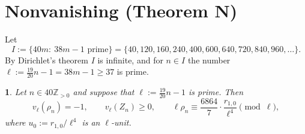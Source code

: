 \documentclass{amsart}
\newcommand{\thisthmname}{}
\newtheorem*{genericthm}{\thisthmname}
\newenvironment{namedthm}[1]{\renewcommand{\thisthmname}{#1}\begin{genericthm}}{\end{genericthm}}
\theoremstyle{definition}
\theoremstyle{remark}
\numberwithin{equation}{section}
\newcommand{\Z}{\mathbb{Z}}
\begin{document}
\section{Nonvanishing (Theorem N)}\label{sec:N}

Let
\[
  I:=\{40m:\ 38m-1\text{ prime}\}=\{40,120,160,240,400,600,640,720,840,960,\dots\}.
\]
By Dirichlet's theorem $I$ is infinite, and for $n\in I$ the number
$\ell:=\frac{19}{20}n-1=38m-1\ge37$ is prime.

\begin{namedthm}{Theorem N}
Let $n\in40\Z_{>0}$ and suppose that $\ell:=\frac{19}{20}n-1$ is prime. Then
\[
  v_\ell(\rho_n)=-1,\qquad v_\ell(Z_n)\ge0,\qquad
  \ell\rho_n\equiv\frac{6864}{7}\cdot\frac{r_{1,0}}{\ell^4}\pmod\ell,
\]
where $u_0:=r_{1,0}/\ell^4$ is an $\ell$-unit.
\end{namedthm}
\end{document}
